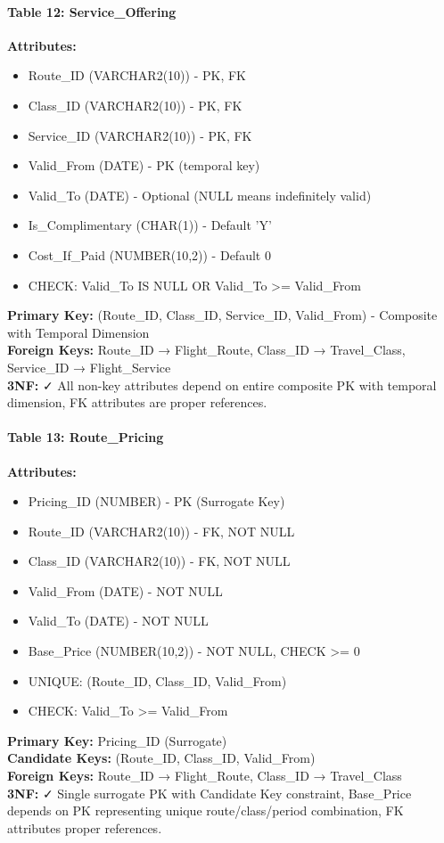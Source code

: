 \documentclass[12pt,a4paper,openany]{report}
\begin{document}
\paragraph{Table 12: Service\_Offering}
\textbf{Attributes:} 
\begin{itemize}
    \item Route\_ID (VARCHAR2(10)) - PK, FK
    \item Class\_ID (VARCHAR2(10)) - PK, FK
    \item Service\_ID (VARCHAR2(10)) - PK, FK
    \item Valid\_From (DATE) - PK (temporal key)
    \item Valid\_To (DATE) - Optional (NULL means indefinitely valid)
    \item Is\_Complimentary (CHAR(1)) - Default 'Y'
    \item Cost\_If\_Paid (NUMBER(10,2)) - Default 0
    \item CHECK: Valid\_To IS NULL OR Valid\_To >= Valid\_From
\end{itemize}
\textbf{Primary Key:} (Route\_ID, Class\_ID, Service\_ID, Valid\_From) - Composite with Temporal Dimension\\
\textbf{Foreign Keys:} Route\_ID → Flight\_Route, Class\_ID → Travel\_Class, Service\_ID → Flight\_Service\\
\textbf{3NF:} ✓ All non-key attributes depend on entire composite PK with temporal dimension, FK attributes are proper references.

\paragraph{Table 13: Route\_Pricing}
\textbf{Attributes:} 
\begin{itemize}
    \item Pricing\_ID (NUMBER) - PK (Surrogate Key)
    \item Route\_ID (VARCHAR2(10)) - FK, NOT NULL
    \item Class\_ID (VARCHAR2(10)) - FK, NOT NULL
    \item Valid\_From (DATE) - NOT NULL
    \item Valid\_To (DATE) - NOT NULL
    \item Base\_Price (NUMBER(10,2)) - NOT NULL, CHECK >= 0
    \item UNIQUE: (Route\_ID, Class\_ID, Valid\_From)
    \item CHECK: Valid\_To >= Valid\_From
\end{itemize}
\textbf{Primary Key:} Pricing\_ID (Surrogate)\\
\textbf{Candidate Keys:} (Route\_ID, Class\_ID, Valid\_From)\\
\textbf{Foreign Keys:} Route\_ID → Flight\_Route, Class\_ID → Travel\_Class\\
\textbf{3NF:} ✓ Single surrogate PK with Candidate Key constraint, Base\_Price depends on PK representing unique route/class/period combination, FK attributes proper references.
\end{document}
